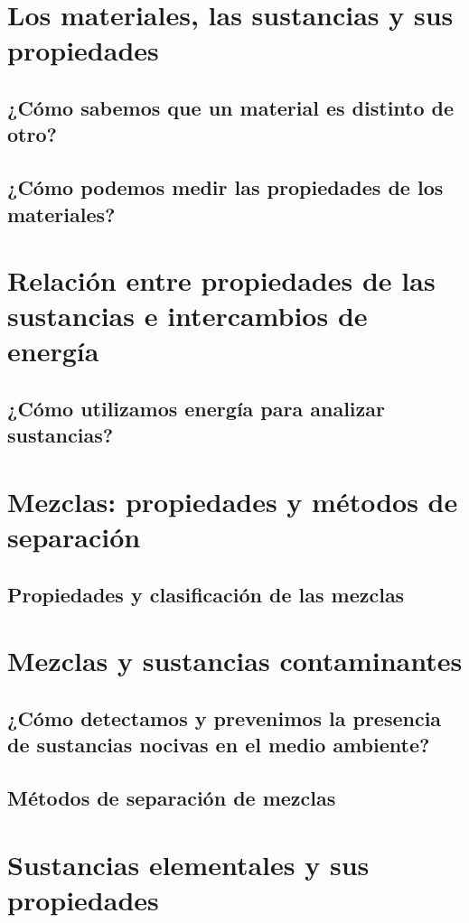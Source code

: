 \documentclass[11pt]{book}
\begin{document}
\section{Los materiales, las sustancias y sus propiedades}
\subsection{¿Cómo sabemos que un material es distinto de otro?}
\subsection{¿Cómo podemos medir las propiedades de los materiales?}
\section{Relación entre propiedades de las sustancias e intercambios de energía}
\subsection{¿Cómo utilizamos energía para analizar sustancias?}

\section{Mezclas: propiedades y métodos de separación}

\subsection{Propiedades y clasificación de las mezclas}

\section{Mezclas y sustancias contaminantes}
\subsection{¿Cómo detectamos y prevenimos la presencia de sustancias nocivas en el medio ambiente?}

\subsection{Métodos de separación de mezclas}

\section{Sustancias elementales y sus propiedades}
\end{document}
